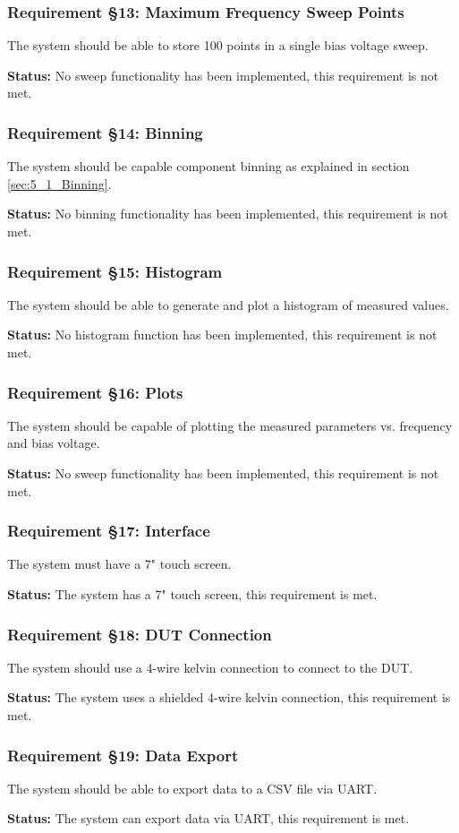 \subsubsection*{Requirement §13: Maximum Frequency Sweep Points}
The system should be able to store 100 points in a single bias voltage sweep.

\textbf{Status:} No sweep functionality has been implemented, this requirement is not met.
\nl
\nl

\subsubsection*{Requirement §14: Binning}
The system should be capable component binning as explained in section \ref{sec:5_1_Binning}.

\textbf{Status:} No binning functionality has been implemented, this requirement is not met.
\nl
\nl

\subsubsection*{Requirement §15: Histogram}
The system should be able to generate and plot a histogram of measured values.

\textbf{Status:} No histogram function has been implemented, this requirement is not met.
\nl
\nl

\subsubsection*{Requirement §16: Plots}
The system should be capable of plotting the measured parameters vs. frequency and bias voltage.

\textbf{Status:} No sweep functionality has been implemented, this requirement is not met.
\nl
\nl

\subsubsection*{Requirement §17: Interface}
The system must have a 7" touch screen.

\textbf{Status:} The system has a 7" touch screen, this requirement is met.
\nl
\nl

\subsubsection*{Requirement §18: DUT Connection}
The system should use a 4-wire kelvin connection to connect to the DUT.

\textbf{Status:} The system uses a shielded 4-wire kelvin connection, this requirement is met.
\nl
\nl

\subsubsection*{Requirement §19: Data Export}
The system should be able to export data to a CSV file via UART.

\textbf{Status:} The system can export data via UART, this requirement is met.
\nl
\nl

